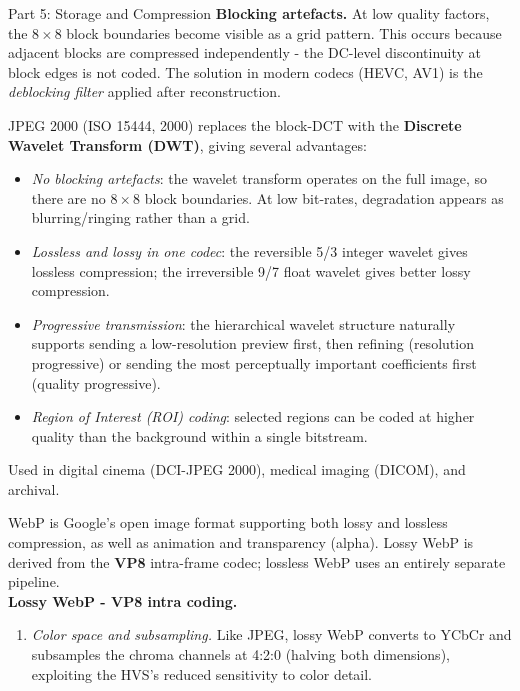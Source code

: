 \documentclass[letterpaper]{article}
\begin{document}
\begin{notes}{Part 5: Storage and Compression}
\textbf{Blocking artefacts.} At low quality factors, the $8\times8$ block boundaries become visible as a grid pattern. This occurs because adjacent blocks are compressed independently - the DC-level discontinuity at block edges is not coded. The solution in modern codecs (HEVC, AV1) is the \emph{deblocking filter} applied after reconstruction.


JPEG 2000 (ISO 15444, 2000) replaces the block-DCT with the \textbf{Discrete Wavelet Transform (DWT)}, giving several advantages:
\begin{itemize}
    \item \emph{No blocking artefacts}: the wavelet transform operates on the full image, so there are no $8\times8$ block boundaries. At low bit-rates, degradation appears as blurring/ringing rather than a grid.
    \item \emph{Lossless and lossy in one codec}: the reversible 5/3 integer wavelet gives lossless compression; the irreversible 9/7 float wavelet gives better lossy compression.
    \item \emph{Progressive transmission}: the hierarchical wavelet structure naturally supports sending a low-resolution preview first, then refining (resolution progressive) or sending the most perceptually important coefficients first (quality progressive).
    \item \emph{Region of Interest (ROI) coding}: selected regions can be coded at higher quality than the background within a single bitstream.
\end{itemize}
Used in digital cinema (DCI-JPEG 2000), medical imaging (DICOM), and archival.



WebP is Google's open image format supporting both lossy and lossless compression, as well as animation and transparency (alpha). Lossy WebP is derived from the \textbf{VP8} intra-frame codec; lossless WebP uses an entirely separate pipeline.\\

\textbf{Lossy WebP - VP8 intra coding.}


\begin{enumerate}
    \item \textit{Color space and subsampling.} Like JPEG, lossy WebP converts to YCbCr and subsamples the chroma channels at 4:2:0 (halving both dimensions), exploiting the HVS's reduced sensitivity to color detail.


\end{enumerate}
\end{notes}
\end{document}
